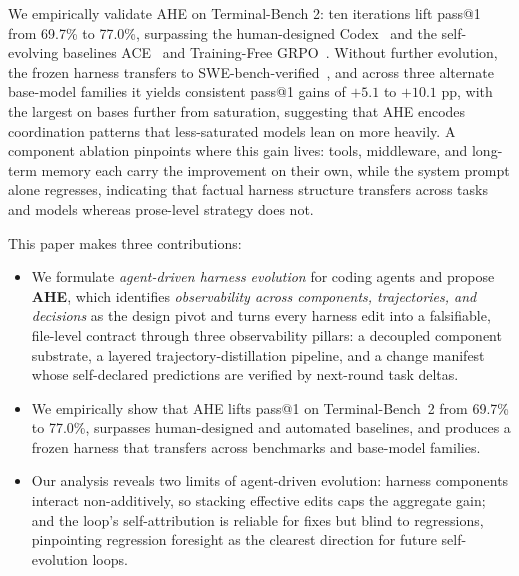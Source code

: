 We empirically validate AHE on Terminal-Bench 2\citep{merrillTerminalBenchBenchmarkingAgents2026a}: ten iterations lift pass@1 from 69.7\% to 77.0\%, surpassing the human-designed Codex~\citep{openaiCodexCLI2025} and the self-evolving baselines ACE~\citep{zhangAgenticContextEngineering2025a} and Training-Free GRPO~\citep{caiTrainingFreeGroupRelative2025}.
Without further evolution, the frozen harness transfers to SWE-bench-verified~\citep{jimenezSWEbenchCanLanguage2023}, and across three alternate base-model families it yields consistent pass@1 gains of $+5.1$ to $+10.1$ pp, with the largest on bases further from saturation, suggesting that AHE encodes coordination patterns that less-saturated models lean on more heavily.
A component ablation pinpoints where this gain lives: tools, middleware, and long-term memory each carry the improvement on their own, while the system prompt alone regresses, indicating that factual harness structure transfers across tasks and models whereas prose-level strategy does not.

This paper makes three contributions:
\begin{itemize}
    \item We formulate \emph{agent-driven harness evolution} for coding agents and propose \textbf{AHE}, which identifies \emph{observability across components, trajectories, and decisions} as the design pivot and turns every harness edit into a falsifiable, file-level contract through three observability pillars: a decoupled component substrate, a layered trajectory-distillation pipeline, and a change manifest whose self-declared predictions are verified by next-round task deltas.
    \item We empirically show that AHE lifts pass@1 on Terminal-Bench~2 from 69.7\% to 77.0\%, surpasses human-designed and automated baselines, and produces a frozen harness that transfers across benchmarks and base-model families.
    \item Our analysis reveals two limits of agent-driven evolution: harness components interact non-additively, so stacking effective edits caps the aggregate gain; and the loop's self-attribution is reliable for fixes but blind to regressions, pinpointing regression foresight as the clearest direction for future self-evolution loops.
\end{itemize}


